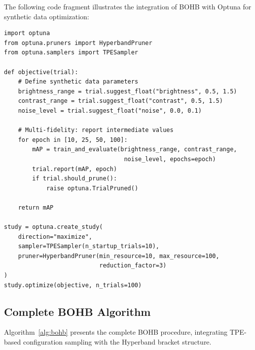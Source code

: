 The following code fragment illustrates the integration of BOHB with Optuna for synthetic data optimization:

\begin{verbatim}
import optuna
from optuna.pruners import HyperbandPruner
from optuna.samplers import TPESampler

def objective(trial):
    # Define synthetic data parameters
    brightness_range = trial.suggest_float("brightness", 0.5, 1.5)
    contrast_range = trial.suggest_float("contrast", 0.5, 1.5)
    noise_level = trial.suggest_float("noise", 0.0, 0.1)

    # Multi-fidelity: report intermediate values
    for epoch in [10, 25, 50, 100]:
        mAP = train_and_evaluate(brightness_range, contrast_range,
                                  noise_level, epochs=epoch)
        trial.report(mAP, epoch)
        if trial.should_prune():
            raise optuna.TrialPruned()

    return mAP

study = optuna.create_study(
    direction="maximize",
    sampler=TPESampler(n_startup_trials=10),
    pruner=HyperbandPruner(min_resource=10, max_resource=100,
                           reduction_factor=3)
)
study.optimize(objective, n_trials=100)
\end{verbatim}

\subsection{Complete BOHB Algorithm}

Algorithm~\ref{alg:bohb} presents the complete BOHB procedure, integrating TPE-based configuration sampling with the Hyperband bracket structure.

